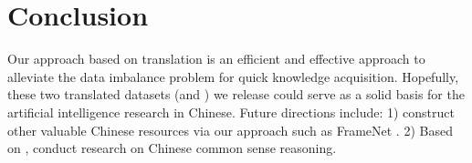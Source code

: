 \section{Conclusion}	
\label{sec:conclusion}	
Our approach based on translation is an efficient and effective approach to alleviate the data imbalance problem for quick knowledge acquisition. Hopefully, these two translated datasets (\zhcon and \zhpro) we release could serve as a solid basis for the artificial intelligence research in Chinese. Future directions include: 1) construct other valuable Chinese resources via our approach such as FrameNet \cite{Baker_98}. 2) Based on \zhcon, conduct research on Chinese common sense reasoning. 
 




